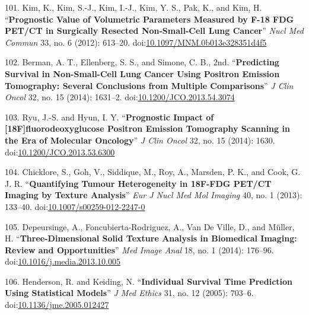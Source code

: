 \documentclass[11pt,]{article}
\begin{document}
\hypertarget{ref-Kim:2012aa}{}
101. Kim, K., Kim, S.-J., Kim, I.-J., Kim, Y. S., Pak, K., and Kim, H.
``\textbf{Prognostic Value of Volumetric Parameters Measured by F-18 FDG
PET/CT in Surgically Resected Non-Small-Cell Lung Cancer}'' \emph{Nucl
Med Commun} 33, no. 6 (2012): 613--20.
doi:\href{https://doi.org/10.1097/MNM.0b013e328351d4f5}{10.1097/MNM.0b013e328351d4f5}

\hypertarget{ref-Berman:2014aa}{}
102. Berman, A. T., Ellenberg, S. S., and Simone, C. B., 2nd.
``\textbf{Predicting Survival in Non-Small-Cell Lung Cancer Using
Positron Emission Tomography: Several Conclusions from Multiple
Comparisons}'' \emph{J Clin Oncol} 32, no. 15 (2014): 1631--2.
doi:\href{https://doi.org/10.1200/JCO.2013.54.3074}{10.1200/JCO.2013.54.3074}

\hypertarget{ref-Ryu:2014aa}{}
103. Ryu, J.-S. and Hyun, I. Y. ``\textbf{Prognostic Impact of
{[}18F{]}fluorodeoxyglucose Positron Emission Tomography Scanning in the
Era of Molecular Oncology}'' \emph{J Clin Oncol} 32, no. 15 (2014):
1630.
doi:\href{https://doi.org/10.1200/JCO.2013.53.6300}{10.1200/JCO.2013.53.6300}

\hypertarget{ref-Chicklore:2013aa}{}
104. Chicklore, S., Goh, V., Siddique, M., Roy, A., Marsden, P. K., and
Cook, G. J. R. ``\textbf{Quantifying Tumour Heterogeneity in 18F-FDG
PET/CT Imaging by Texture Analysis}'' \emph{Eur J Nucl Med Mol Imaging}
40, no. 1 (2013): 133--40.
doi:\href{https://doi.org/10.1007/s00259-012-2247-0}{10.1007/s00259-012-2247-0}

\hypertarget{ref-Depeursinge:2014aa}{}
105. Depeursinge, A., Foncubierta-Rodriguez, A., Van De Ville, D., and
Müller, H. ``\textbf{Three-Dimensional Solid Texture Analysis in
Biomedical Imaging: Review and Opportunities}'' \emph{Med Image Anal}
18, no. 1 (2014): 176--96.
doi:\href{https://doi.org/10.1016/j.media.2013.10.005}{10.1016/j.media.2013.10.005}

\hypertarget{ref-Henderson:2005aa}{}
106. Henderson, R. and Keiding, N. ``\textbf{Individual Survival Time
Prediction Using Statistical Models}'' \emph{J Med Ethics} 31, no. 12
(2005): 703--6.
doi:\href{https://doi.org/10.1136/jme.2005.012427}{10.1136/jme.2005.012427}
\end{document}
